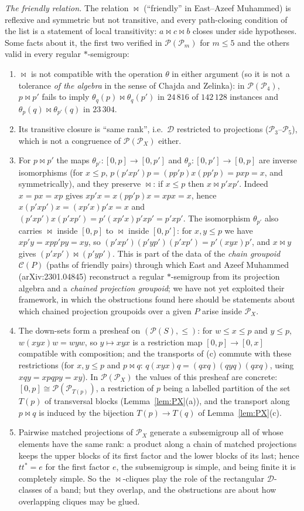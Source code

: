 \documentclass[11pt]{amsart}
\theoremstyle{definition}
\newcommand{\D}{\mathcal{D}}
\renewcommand{\P}{\mathcal{P}}
\newcommand{\mt}{\bowtie}   %
\begin{document}
\smallskip
\emph{The friendly relation.} The relation $\mt$ (``friendly'' in East--Azeef Muhammed) is reflexive and symmetric but not transitive, and every path-closing condition of the list is a statement of local transitivity: $a\mt c\mt b$ closes under side hypotheses. Some facts about it, the first two verified in $\P(\P_m)$ for $m\le5$ and the others valid in every regular $*$-semigroup:
\begin{enumerate}[nosep,label=(\alph*)]
\item $\mt$ is not compatible with the operation $\theta$ in either argument (so it is not a tolerance \emph{of the algebra} in the sense of Chajda and Zelinka): in $\P(\P_4)$, $p\mt p'$ fails to imply $\theta_q(p)\mt\theta_q(p')$ in $24\,816$ of $142\,128$ instances and $\theta_p(q)\mt\theta_{p'}(q)$ in $23\,304$.
\item Its transitive closure is ``same rank'', i.e.\ $\D$ restricted to projections ($\P_3$--$\P_5$), which is not a congruence of $\P(\P_X)$ either.
\item For $p\mt p'$ the maps $\theta_{p'}\colon[0,p]\to[0,p']$ and $\theta_p\colon[0,p']\to[0,p]$ are inverse isomorphisms (for $x\le p$, $p(p'xp')p=(pp'p)x(pp'p)=pxp=x$, and symmetrically), and they preserve $\mt$: if $x\le p$ then $x\mt p'xp'$. Indeed $x=px=xp$ gives $xp'x=x(pp'p)x=xpx=x$, hence $x(p'xp')x=(xp'x)p'x=x$ and $(p'xp')x(p'xp')=p'(xp'x)p'xp'=p'xp'$. The isomorphism $\theta_{p'}$ also carries $\mt$ inside $[0,p]$ to $\mt$ inside $[0,p']$: for $x,y\le p$ we have $xp'y=xpp'py=xy$, so $(p'xp')(p'yp')(p'xp')=p'(xyx)p'$, and $x\mt y$ gives $(p'xp')\mt(p'yp')$. This is part of the data of the \emph{chain groupoid} $\mathcal C(P)$ (paths of friendly pairs) through which East and Azeef Muhammed (arXiv:2301.04845) reconstruct a regular $*$-semigroup from its projection algebra and a \emph{chained projection groupoid}; we have not yet exploited their framework, in which the obstructions found here should be statements about which chained projection groupoids over a given $P$ arise inside $\P_X$.
\item The down-sets form a presheaf on $(\P(S),\le)$: for $w\le x\le p$ and $y\le p$, $w(xyx)w=wyw$, so $y\mapsto xyx$ is a restriction map $[0,p]\to[0,x]$ compatible with composition; and the transports of (c) commute with these restrictions (for $x,y\le p$ and $p\mt q$: $q(xyx)q=(qxq)(qyq)(qxq)$, using $xqy=xpqpy=xy$). In $\P(\P_X)$ the values of this presheaf are concrete: $[0,p]\cong\P(\P_{T(p)})$, a restriction of $p$ being a labelled partition of the set $T(p)$ of transversal blocks (Lemma~\ref{lem:PX}(a)), and the transport along $p\mt q$ is induced by the bijection $T(p)\to T(q)$ of Lemma~\ref{lem:PX}(c).
\item Pairwise matched projections of $\P_X$ generate a subsemigroup all of whose elements have the same rank: a product along a chain of matched projections keeps the upper blocks of its first factor and the lower blocks of its last; hence $tt^*=e$ for the first factor $e$, the subsemigroup is simple, and being finite it is completely simple. So the $\mt$-cliques play the role of the rectangular $\D$-classes of a band; but they overlap, and the obstructions are about how overlapping cliques may be glued.
\end{enumerate}
\end{document}
